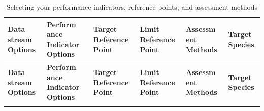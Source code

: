 \documentclass[]{book}
\begin{document}
\begin{longtable}[]{@{}llllll@{}}
\caption{\label{tab:indicators} Selecting your performance indicators,
reference points, and assessment methods}\tabularnewline
\toprule
\begin{minipage}[b]{0.14\columnwidth}\raggedright\strut
\textbf{Data stream Options}\strut
\end{minipage} & \begin{minipage}[b]{0.14\columnwidth}\raggedright\strut
\textbf{Perform ance Indicator Options}\strut
\end{minipage} & \begin{minipage}[b]{0.14\columnwidth}\raggedright\strut
\textbf{Target Reference Point}\strut
\end{minipage} & \begin{minipage}[b]{0.14\columnwidth}\raggedright\strut
\textbf{Limit Reference Point}\strut
\end{minipage} & \begin{minipage}[b]{0.14\columnwidth}\raggedright\strut
\textbf{Assessm ent Methods}\strut
\end{minipage} & \begin{minipage}[b]{0.14\columnwidth}\raggedright\strut
\textbf{Target Species}\strut
\end{minipage}\tabularnewline
\midrule
\endfirsthead
\toprule
\begin{minipage}[b]{0.14\columnwidth}\raggedright\strut
\textbf{Data stream Options}\strut
\end{minipage} & \begin{minipage}[b]{0.14\columnwidth}\raggedright\strut
\textbf{Perform ance Indicator Options}\strut
\end{minipage} & \begin{minipage}[b]{0.14\columnwidth}\raggedright\strut
\textbf{Target Reference Point}\strut
\end{minipage} & \begin{minipage}[b]{0.14\columnwidth}\raggedright\strut
\textbf{Limit Reference Point}\strut
\end{minipage} & \begin{minipage}[b]{0.14\columnwidth}\raggedright\strut
\textbf{Assessm ent Methods}\strut
\end{minipage} & \begin{minipage}[b]{0.14\columnwidth}\raggedright\strut
\textbf{Target Species}\strut
\end{minipage}\tabularnewline
\midrule
\endhead
\begin{minipage}[t]{0.14\columnwidth}\raggedright\strut

\end{minipage}
\end{longtable}
\end{document}
